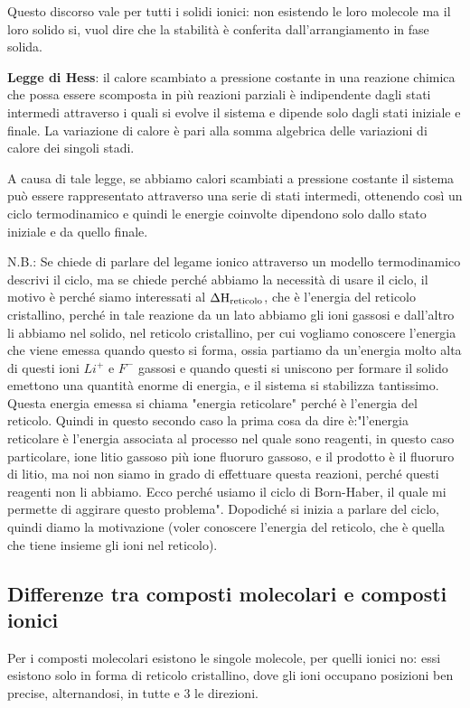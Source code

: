 Questo discorso vale per tutti i solidi ionici: non esistendo le loro molecole ma il loro solido si, vuol dire che la stabilità è conferita dall'arrangiamento in fase solida.

\vspace{0.2cm}\textbf{Legge di Hess}: il calore scambiato a pressione costante in una reazione chimica che possa essere scomposta in più reazioni parziali è indipendente dagli stati intermedi attraverso i quali si evolve il sistema e dipende solo dagli stati iniziale e finale. La variazione di calore è pari alla somma algebrica delle variazioni di calore dei singoli stadi.

A causa di tale legge, se abbiamo calori scambiati a pressione costante il sistema può essere rappresentato attraverso una serie di stati intermedi, ottenendo così un ciclo termodinamico e quindi le energie coinvolte dipendono solo dallo stato iniziale e da quello finale.

\vspace{0.2cm}N.B.: Se chiede di parlare del legame ionico attraverso un modello termodinamico descrivi il ciclo, ma se chiede perché abbiamo la necessità di usare il ciclo, il motivo è perché siamo interessati al $\Delta\rm{H}_{reticolo}$, che è l'energia del reticolo cristallino, perché in tale reazione da un lato abbiamo gli ioni gassosi e dall'altro li abbiamo nel solido, nel reticolo cristallino, per cui vogliamo conoscere l'energia che viene emessa quando questo si forma, ossia partiamo da un'energia molto alta di questi ioni $Li^+$ e $F^-$ gassosi e quando questi si uniscono per formare il solido emettono una quantità enorme di energia, e il sistema si stabilizza tantissimo. Questa energia emessa si chiama "energia reticolare" perché è l'energia del reticolo. Quindi in questo secondo caso la prima cosa da dire è:"l'energia reticolare è l'energia associata al processo nel quale sono reagenti, in questo caso particolare, ione litio gassoso più ione fluoruro gassoso, e il prodotto è il fluoruro di litio, ma noi non siamo in grado di effettuare questa reazioni, perché questi reagenti non li abbiamo. Ecco perché usiamo il ciclo di Born-Haber, il quale mi permette di aggirare questo problema". Dopodiché si  inizia a parlare del ciclo, quindi diamo la motivazione (voler conoscere l'energia del reticolo, che è quella che tiene insieme gli ioni nel reticolo).

\subsection{Differenze tra composti molecolari e composti ionici}
Per i composti molecolari esistono le singole molecole, per quelli ionici no: essi esistono solo in forma di reticolo cristallino, dove gli ioni occupano posizioni ben precise, alternandosi, in tutte e 3 le direzioni.

